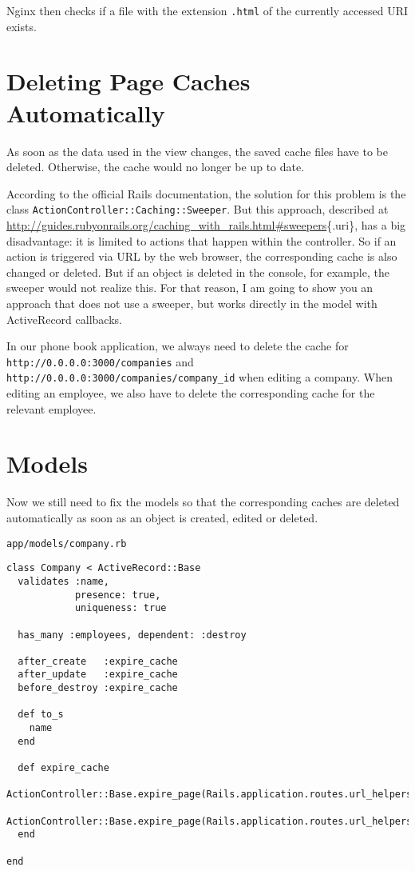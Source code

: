 \documentclass[a4paper]{book}
\newcommand{\chap}[1]{\newpage\thispagestyle{empty}\chapter{#1}\label{chap:\thechapter}}
\begin{document}
Nginx then checks if a file with the extension \texttt{.html} of the currently accessed URI exists.

\chap{Deleting Page Caches Automatically}\label{deleting-page-caches-automatically}

As soon as the data used in the view changes, the saved cache files have to be deleted. Otherwise, the cache would no longer be up to date.

According to the official Rails documentation, the solution for this problem is the class \texttt{ActionController::Caching::Sweeper}. But this approach, described at \url{http://guides.rubyonrails.org/caching_with_rails.html\#sweepers}\{.uri\}, has a big disadvantage: it is limited to actions that happen within the controller. So if an action is triggered via URL by the web browser, the corresponding cache is also changed or deleted. But if an object is deleted in the console, for example, the sweeper would not realize this. For that reason, I am going to show you an approach that does not use a sweeper, but works directly in the model with ActiveRecord callbacks.

In our phone book application, we always need to delete the cache for \texttt{http://0.0.0.0:3000/companies} and \texttt{http://0.0.0.0:3000/companies/company\_id} when editing a company. When editing an employee, we also have to delete the corresponding cache for the relevant employee.

\chap{Models}\label{models-1}

Now we still need to fix the models so that the corresponding caches are deleted automatically as soon as an object is created, edited or deleted.

\texttt{app/models/company.rb}

\begin{shaded}\begin{verbatim}
class Company < ActiveRecord::Base
  validates :name,
            presence: true,
            uniqueness: true

  has_many :employees, dependent: :destroy

  after_create   :expire_cache
  after_update   :expire_cache
  before_destroy :expire_cache

  def to_s
    name
  end

  def expire_cache
    ActionController::Base.expire_page(Rails.application.routes.url_helpers.company_path(self))
    ActionController::Base.expire_page(Rails.application.routes.url_helpers.companies_path)
  end

end
\end{verbatim}\end{shaded}
\end{document}
